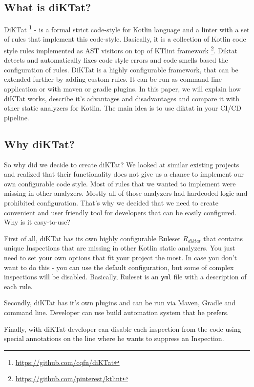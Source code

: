 \subsection{What is diKTat?}
DiKTat \footnote{\url{https://github.com/cqfn/diKTat}} - is a formal strict code-style for Kotlin language and a linter with a set of rules that implement this code-style. Basically, it is a collection of Kotlin code style rules implemented as AST visitors on top of KTlint framework \footnote{\url{https://github.com/pinterest/ktlint}}. Diktat detects and automatically fixes code style errors and code smells based the configuration of rules. DiKTat is a highly configurable framework, that can be extended further by adding custom rules. It can be run as command line application or with maven or gradle plugins. In this paper, we will explain how diKTat works, describe it's advantages and disadvantages and compare it with other static analyzers for Kotlin. The main idea is to use diktat in your CI/CD pipeline.

\subsection{Why diKTat?}
So why did we decide to create diKTat? We looked at similar existing projects and realized that their functionality does not give us a chance to implement our own configurable code style. Most of rules that we wanted to implement were missing in other analyzers. Mostly all of those analyzers had hardcoded logic and prohibited configuration. That’s why we decided that we need to create convenient and user friendly tool for developers that can be easily configured. Why is it easy-to-use?

First of all, diKTat has its own highly configurable Ruleset $R_{diktat}$ that contains unique Inspections that are missing in other Kotlin static analyzers. You just need to set your own options that fit your project the most. In case you don't want to do this - you can use the default configuration, but some of complex inspections will be disabled. Basically, Ruleset is an \texttt{yml} file with a description of each rule. 

Secondly, diKTat has it's own plugins and can be run via Maven, Gradle and command line. Developer can use build automation system that he prefers.

Finally, with diKTat developer can disable each inspection from the code using special annotations on the line where he wants to suppress an Inspection.